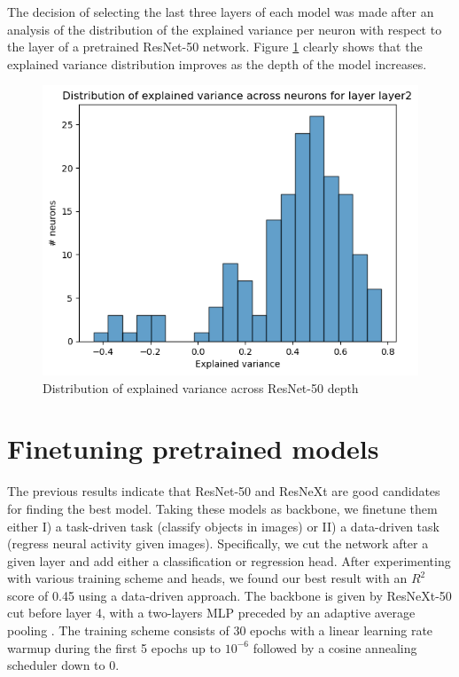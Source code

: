 \documentclass[10pt,conference,compsocconf]{IEEEtran}
\begin{document}
The decision of selecting the last three layers of each model was made after an analysis of the distribution of the explained variance per neuron with respect to the layer of a pretrained ResNet-50 network. Figure \ref{fig:explvar} clearly shows that the explained variance distribution improves as the depth of the model increases.

\begin{figure}[h!]
    \centering
    \includegraphics[width=0.8\columnwidth]{explvar.png}
    \caption{Distribution of explained variance across ResNet-50 depth}
    \label{fig:explvar}
\end{figure}
\FloatBarrier

\section{Finetuning pretrained models}
The previous results indicate that ResNet-50 and ResNeXt are good candidates for finding the best model. Taking these models as backbone, we finetune them either I) a task-driven task (classify objects in images) or II) a data-driven task (regress neural activity given images). Specifically, we cut the network after a given layer and add either a classification or regression head. After experimenting with various training scheme and heads, we found our best result with an \(R^2\) score of 0.45 using a data-driven approach. The backbone is given by ResNeXt-50 cut before layer 4, with a two-layers MLP preceded by an adaptive average pooling \cite{AdaptiveAvgPool}. The training scheme consists of 30 epochs with a linear learning rate warmup during the first 5 epochs up to \(10^{-6}\) followed by a cosine annealing scheduler down to 0.

\newpage


\end{document}

